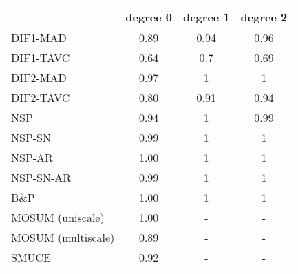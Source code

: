 \begin{tabular}{|l|c|c|c|}
  \hline
 & degree 0 & degree 1 & degree 2 \\ 
  \hline
DIF1-MAD & 0.89 & 0.94 & 0.96 \\ 
  DIF1-TAVC & 0.64 & 0.7 & 0.69 \\ 
  DIF2-MAD & 0.97 & 1 & 1 \\ 
  DIF2-TAVC & 0.80 & 0.91 & 0.94 \\ 
  NSP & 0.94 & 1 & 0.99 \\ 
  NSP-SN & 0.99 & 1 & 1 \\ 
  NSP-AR & 1.00 & 1 & 1 \\ 
  NSP-SN-AR & 0.99 & 1 & 1 \\ 
  B\&P & 1.00 & 1 & 1 \\ 
  MOSUM (uniscale) & 1.00 & - & - \\ 
  MOSUM (multiscale) & 0.89 & - & - \\ 
  SMUCE & 0.92 & - & - \\ 
   \hline
\end{tabular}
